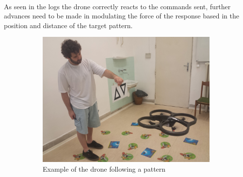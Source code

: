 \documentclass[11pt,twoside,a4paper]{article}
\begin{document}
\paragraph{} As seen in the logs the drone correctly reacts to the commands
sent, further advances need to be made in modulating the force of the response
based in the position and distance of the target pattern.
\begin{figure}[hbtp]
  \centering
\begin{subfigure}{.99\textwidth}
  \centering
  \includegraphics[width=1\linewidth]{tracking.jpg}
Example of the drone following a pattern
\end{subfigure}
\end{figure}
\end{document}
